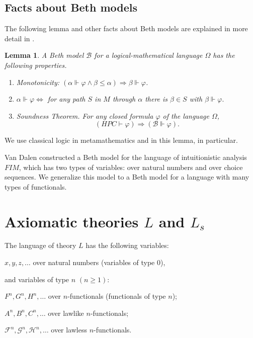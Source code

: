 \documentclass{asl}
\newtheorem{lemma}{Lemma}[section]
\theoremstyle{definition}
\begin{document}
\subsection{Facts about Beth models}
The following lemma and other facts about Beth models are explained in more detail in \cite{vand78}.
\begin{lemma}
A Beth model $ \mathcal{B} $ for a logical-mathematical language $ \Omega $ has the following properties.
\begin{enumerate}
\item Monotonicity: 
$ (\alpha\Vdash\varphi \wedge \beta\leqslant\alpha)\Rightarrow\beta\Vdash\varphi$. 
\medskip

\item $ \alpha\Vdash\varphi\Leftrightarrow $ for any path $ S $ in $ M $ through $ \alpha $ there is $ \beta\in S $ with $ \beta\Vdash\varphi. $
\medskip

\item Soundness Theorem. For any closed formula $ \varphi $ of the language $\Omega$,
\[ (HPC\vdash\varphi)\Rightarrow (\mathcal{B}\Vdash\varphi). \]


\end{enumerate}  \label{lemma:Beth}
\end{lemma}

We use classical logic in metamathematics and in this lemma, in particular.

Van Dalen \cite{vand78} constructed a Beth model for the language of intuitionistic analysis $FIM$, which has two types of variables: over natural numbers and over choice sequences. We generalize this model to a Beth model for a language with many types of functionals.

\section{Axiomatic theories $L$ and $L_s$}

The language of theory $ L $ has the following variables:
\begin{list}{}{}
\item $x,y,z,\ldots$ over natural numbers (variables of type 0),
\item and variables of type $ n$ $(n\geqslant 1):$
\begin{list}{}{}
\item $F^n,G^n,H^n,\ldots$ over $n$-functionals (functionals of type $n$);
\item $A^n,B^n,C^n,\ldots$ over lawlike $n$-functionals;
\item $\mathcal{F}^n,\mathcal{G}^n,\mathcal{H}^n,\ldots$ over lawless $n$-functionals.
\end{list}
\end{list}
\smallskip
\end{document}
